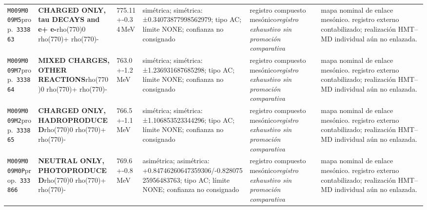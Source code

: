 \begin{landscape}
\begin{longtable}{L{1.85cm}L{4.45cm}L{2.35cm}L{4.05cm}L{3.35cm}L{7.15cm}}
\texttt{M009}\newline \texttt{M009M5}\newline prop.\ \texttt{333863} & \textbf{CHARGED ONLY, tau DECAYS and e+ e-}\newline rho(770)0 \textbar{}\allowbreak{} rho(770)+ \textbar{}\allowbreak{} rho(770)- & 775.11+-0.34\,MeV & simétrica; simétrica: ±0.34073877998562979; tipo AC; límite NONE; confianza no consignado & registro compuesto mesónico\newline \emph{registro exhaustivo sin promoción comparativa} & mapa nominal de enlace mesónico. registro externo contabilizado; realización HMT--MD individual aún no enlazada. \\
\texttt{M009}\newline \texttt{M009M7}\newline prop.\ \texttt{333864} & \textbf{MIXED CHARGES, OTHER REACTIONS}\newline rho(770)0 \textbar{}\allowbreak{} rho(770)+ \textbar{}\allowbreak{} rho(770)- & 763.0+-1.2\,MeV & simétrica; simétrica: ±1.236931687685298; tipo AC; límite NONE; confianza no consignado & registro compuesto mesónico\newline \emph{registro exhaustivo sin promoción comparativa} & mapa nominal de enlace mesónico. registro externo contabilizado; realización HMT--MD individual aún no enlazada. \\
\texttt{M009}\newline \texttt{M009M2}\newline prop.\ \texttt{333865} & \textbf{CHARGED ONLY, HADROPRODUCED}\newline rho(770)0 \textbar{}\allowbreak{} rho(770)+ \textbar{}\allowbreak{} rho(770)- & 766.5+-1.1\,MeV & simétrica; simétrica: ±1.106853523344296; tipo AC; límite NONE; confianza no consignado & registro compuesto mesónico\newline \emph{registro exhaustivo sin promoción comparativa} & mapa nominal de enlace mesónico. registro externo contabilizado; realización HMT--MD individual aún no enlazada. \\
\texttt{M009}\newline \texttt{M009M0P}\newline prop.\ \texttt{333866} & \textbf{NEUTRAL ONLY, PHOTOPRODUCED}\newline rho(770)0 \textbar{}\allowbreak{} rho(770)+ \textbar{}\allowbreak{} rho(770)- & 769.6+-0.8\,MeV & asimétrica; asimétrica: +0.84746260647359306/-0.82807525956483763; tipo AC; límite NONE; confianza no consignado & registro compuesto mesónico\newline \emph{registro exhaustivo sin promoción comparativa} & mapa nominal de enlace mesónico. registro externo contabilizado; realización HMT--MD individual aún no enlazada. \\

\end{longtable}
\end{landscape}
